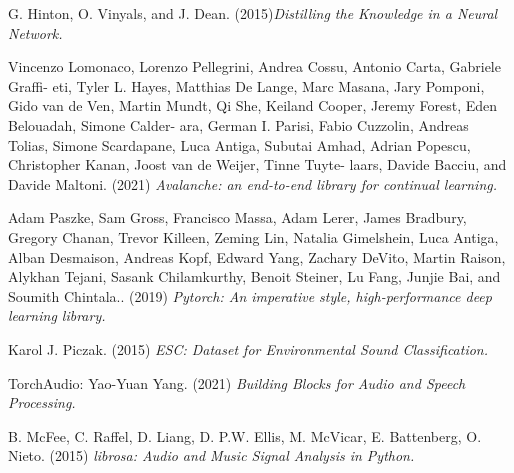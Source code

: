 \documentclass[english, LaM, oneside]{sapthesis}%
\begin{document}
\begin{thebibliography}{17}
G. Hinton, O. Vinyals, and J. Dean. (2015)\textit{Distilling the Knowledge in a Neural Network.} 


Vincenzo Lomonaco, Lorenzo Pellegrini, Andrea Cossu, Antonio Carta, Gabriele Graffi- eti, Tyler L. Hayes, Matthias De Lange, Marc Masana, Jary Pomponi, Gido van de Ven, Martin Mundt, Qi She, Keiland Cooper, Jeremy Forest, Eden Belouadah, Simone Calder- ara, German I. Parisi, Fabio Cuzzolin, Andreas Tolias, Simone Scardapane, Luca Antiga, Subutai Amhad, Adrian Popescu, Christopher Kanan, Joost van de Weijer, Tinne Tuyte- laars, Davide Bacciu, and Davide Maltoni. (2021) \textit{Avalanche: an end-to-end library for continual learning.} 

Adam Paszke, Sam Gross, Francisco Massa, Adam Lerer, James Bradbury, Gregory Chanan, Trevor Killeen, Zeming Lin, Natalia Gimelshein, Luca Antiga, Alban Desmaison, Andreas Kopf, Edward Yang, Zachary DeVito, Martin Raison, Alykhan Tejani, Sasank Chilamkurthy, Benoit Steiner, Lu Fang, Junjie Bai, and Soumith Chintala.. (2019) \textit{Pytorch: An imperative style, high-performance deep learning library.} 

Karol J. Piczak. (2015) \textit{ESC: Dataset for Environmental Sound Classification.}

TorchAudio: Yao-Yuan Yang. (2021) \textit{Building Blocks for Audio and Speech Processing.}

B. McFee, C. Raffel, D. Liang, D. P.W. Ellis, M. McVicar, E. Battenberg, O. Nieto. (2015) \textit{librosa: Audio and Music Signal Analysis in Python.}




 
\end{thebibliography}
\end{document}
